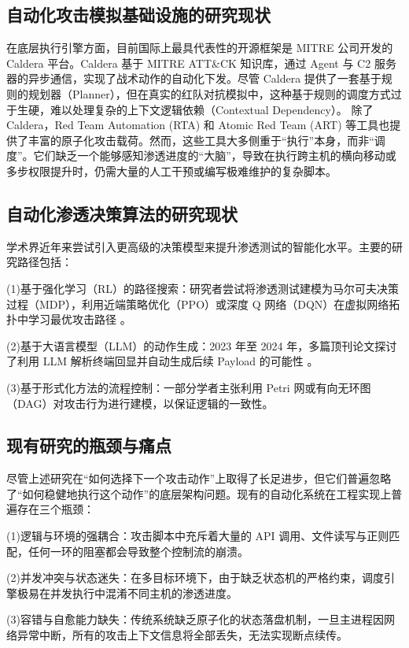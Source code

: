\documentclass[twoside,openright]{xduugthesis}
\begin{document}
\subsection{自动化攻击模拟基础设施的研究现状}
在底层执行引擎方面，目前国际上最具代表性的开源框架是 MITRE 公司开发的 Caldera 平台。Caldera 基于 MITRE ATT\&CK 知识库，通过 Agent 与 C2 服务器的异步通信，实现了战术动作的自动化下发\cite{mitre2024caldera}。尽管 Caldera 提供了一套基于规则的规划器（Planner），但在真实的红队对抗模拟中，这种基于规则的调度方式过于生硬，难以处理复杂的上下文逻辑依赖（Contextual Dependency）。
除了 Caldera，Red Team Automation (RTA) 和 Atomic Red Team (ART) 等工具也提供了丰富的原子化攻击载荷。然而，这些工具大多侧重于“执行”本身，而非“调度”。它们缺乏一个能够感知渗透进度的“大脑”，导致在执行跨主机的横向移动或多步权限提升时，仍需大量的人工干预或编写极难维护的复杂脚本。

\subsection{自动化渗透决策算法的研究现状}
学术界近年来尝试引入更高级的决策模型来提升渗透测试的智能化水平。主要的研究路径包括：

(1)基于强化学习（RL）的路径搜索：研究者尝试将渗透测试建模为马尔可夫决策过程（MDP），利用近端策略优化（PPO）或深度 Q 网络（DQN）在虚拟网络拓扑中学习最优攻击路径 \cite{wang2024automated}。

(2)基于大语言模型（LLM）的动作生成：2023 年至 2024 年，多篇顶刊论文探讨了利用 LLM 解析终端回显并自动生成后续 Payload 的可能性 \cite{zhang2024towards}。

(3)基于形式化方法的流程控制：一部分学者主张利用 Petri 网或有向无环图（DAG）对攻击行为进行建模，以保证逻辑的一致性。

\subsection{现有研究的瓶颈与痛点}
尽管上述研究在“如何选择下一个攻击动作”上取得了长足进步，但它们普遍忽略了“如何稳健地执行这个动作”的底层架构问题。现有的自动化系统在工程实现上普遍存在三个瓶颈：

(1)逻辑与环境的强耦合：攻击脚本中充斥着大量的 API 调用、文件读写与正则匹配，任何一环的阻塞都会导致整个控制流的崩溃。

(2)并发冲突与状态迷失：在多目标环境下，由于缺乏状态机的严格约束，调度引擎极易在并发执行中混淆不同主机的渗透进度。

(3)容错与自愈能力缺失：传统系统缺乏原子化的状态落盘机制，一旦主进程因网络异常中断，所有的攻击上下文信息将全部丢失，无法实现断点续传。
\end{document}
